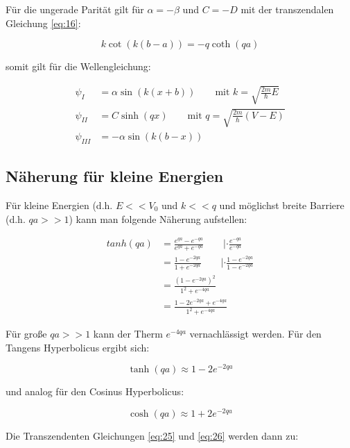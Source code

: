 Für die ungerade Parität gilt für \(\alpha=-\beta\) und \(C=-D\) mit der transzendalen Gleichung \eqref{eq:16}:

\begin{equation}
  \label{eq:27}
 \boxed{ k\cot(k(b-a)) = - q\coth(qa)}
\end{equation}

somit gilt für die Wellengleichung:

\begin{align}
  \label{eq:28}
  \psi_{I} &= \alpha \sin(k(x+b))  \qquad \text{mit } k = \sqrt{\frac{2m}{\hbar}E}\\
  \psi_{II} &= C\sinh(qx) \qquad \text{mit } q = \sqrt{\frac{2m}{\hbar}(V-E)} \\
 \psi_{III} &= -\alpha \sin(k(b-x))
\end{align}

\subsection{Näherung für kleine Energien}

Für kleine Energien (d.h. \(E<<V_0\) und \(k<<q\) und möglichst breite Barriere (d.h. \(qa>>1\)) kann man folgende Näherung aufstellen:

\begin{align}
  \label{eq:29}
  tanh(qa) &= \frac{e^{qa}-e^{-qa}}{e^{qa}+e^{-qa}} \qquad |\cdot  \frac{e^{-qa}}{e^{-qa}}\\
&= \frac{1-e^{-2qa}}{1+e^{-2qa}} \qquad |\cdot \frac{1-e^{-2qa}}{1-e^{-2qa}} \\
&= \frac{(1-e^{-2qa})^2}{1^2+e^{-4qa}} \\
&= \frac{1-2e^{-2qa}+e^{-4qa}}{1^2+e^{-4qa}}
\end{align}

Für große  \(qa>>1\) kann der Therm \( e^{-4qa} \) vernachlässigt werden. Für den Tangens Hyperbolicus ergibt sich:

\begin{equation}
  \label{eq:30}
   \tanh(qa) \approx 1-2e^{-2qa}
\end{equation}

und analog für den Cosinus Hyperbolicus:

\begin{equation}
  \label{eq:31}
   \cosh(qa) \approx 1+2e^{-2qa}
\end{equation}


Die Transzendenten Gleichungen \eqref{eq:25} und \eqref{eq:26} werden dann zu:


